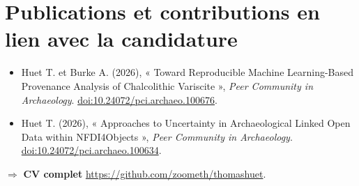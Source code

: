\documentclass[10pt,a4paper]{article}
\begin{document}
\section*{Publications et contributions en lien avec la candidature}
\begin{itemize}
\item Huet T. et Burke A. (2026), « Toward Reproducible Machine Learning-Based Provenance Analysis of Chalcolithic Variscite », \emph{Peer Community in Archaeology}. \href{https://doi.org/10.24072/pci.archaeo.100676}{doi:10.24072/pci.archaeo.100676}.
\item Huet T. (2026), « Approaches to Uncertainty in Archaeological Linked Open Data within NFDI4Objects », \emph{Peer Community in Archaeology}. \href{https://doi.org/10.24072/pci.archaeo.100634}{doi:10.24072/pci.archaeo.100634}.
\end{itemize}

$\Rightarrow$ \textbf{CV complet} \href{https://github.com/zoometh/thomashuet#dr-thomas-huet-}{https://github.com/zoometh/thomashuet}.
\end{document}
